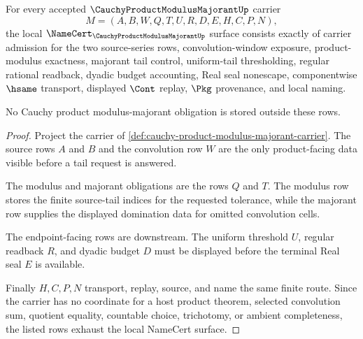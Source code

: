 \begin{theorem}
\label{thm:cauchy-product-modulus-majorant-namecert-obligations}
For every accepted $\CauchyProductModulusMajorantUp$ carrier
$$
M=(A,B,W,Q,T,U,R,D,E,H,C,P,N),
$$
the local $\NameCert_{\CauchyProductModulusMajorantUp}$ surface consists exactly of carrier admission for the two source-series rows, convolution-window exposure, product-modulus exactness, majorant tail control, uniform-tail thresholding, regular rational readback, dyadic budget accounting, Real seal nonescape, componentwise $\hsame$ transport, displayed $\Cont$ replay, $\Pkg$ provenance, and local naming.

No Cauchy product modulus-majorant obligation is stored outside these rows.
\end{theorem}
\begin{proof}
Project the carrier of \autoref{def:cauchy-product-modulus-majorant-carrier}. The source rows $A$ and $B$ and the convolution row $W$ are the only product-facing data visible before a tail request is answered.

The modulus and majorant obligations are the rows $Q$ and $T$. The modulus row stores the finite source-tail indices for the requested tolerance, while the majorant row supplies the displayed domination data for omitted convolution cells.

The endpoint-facing rows are downstream. The uniform threshold $U$, regular readback $R$, and dyadic budget $D$ must be displayed before the terminal Real seal $E$ is available.

Finally $H,C,P,N$ transport, replay, source, and name the same finite route. Since the carrier has no coordinate for a host product theorem, selected convolution sum, quotient equality, countable choice, trichotomy, or ambient completeness, the listed rows exhaust the local NameCert surface.
\end{proof}

